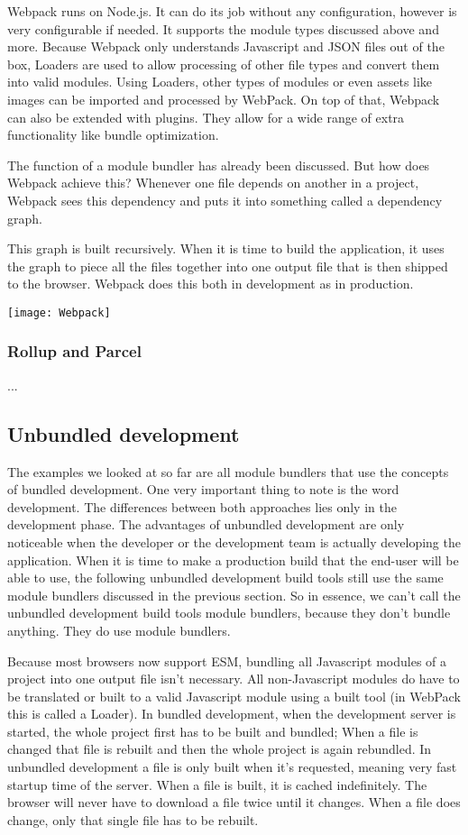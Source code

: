 Webpack runs on Node.js. It can do its job without any configuration, however is very configurable if needed. It supports the module types discussed above and more. 
Because Webpack only understands Javascript and JSON files out of the box, Loaders are used to allow processing of other file types and convert them into valid modules.
Using Loaders, other types of modules or even assets like images can be imported and processed by WebPack. On top of that, Webpack can also be extended with plugins. They allow for a wide range of extra functionality like bundle optimization. 

The function of a module bundler has already been discussed. But how does Webpack achieve this? Whenever one file depends on another in a project, Webpack sees this dependency and puts it into something called a dependency graph. 

This graph is built recursively. When it is time to build the application, it uses the graph to piece all the files together into one output file that is then shipped to the browser. Webpack does this both in development as in production. 

\texttt{[image: Webpack]}

\subsubsection{Rollup and Parcel}
...
\subsection{Unbundled development}

The examples we looked at so far are all module bundlers that use the concepts of bundled development. One very important thing to note is the word development. The differences between both approaches lies only in the development phase. The advantages of unbundled development are only noticeable when the developer or the development team is actually developing the application. When it is time to make a production build that the end-user will be able to use, the following unbundled development build tools still use the same module bundlers discussed in the previous section. So in essence, we can’t call the unbundled development build tools module bundlers, because they don’t bundle anything. They do use module bundlers.

Because most browsers now support ESM, bundling all Javascript modules of a project into one output file isn’t necessary. All non-Javascript modules do have to be translated or built to a valid Javascript module using a built tool (in WebPack this is called a Loader). In bundled development, when the development server is started, the whole project first has to be built and bundled; When a file is changed that file is rebuilt and then the whole project is again rebundled. In unbundled development a file is only built when it’s requested, meaning very fast startup time of the server. When a file is built, it is cached indefinitely. The browser will never have to download a file twice until it changes. When a file does change, only that single file has to be rebuilt. 

